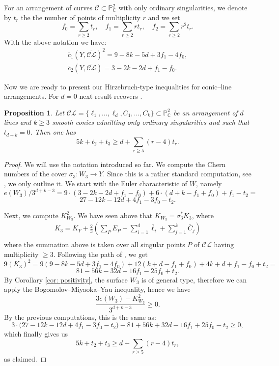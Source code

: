 \documentclass[12pt]{amsart}
\theoremstyle{plain}
\newtheorem{proposition}[thm]{Proposition}
\theoremstyle{definition}
\renewcommand\geq{\geqslant}
\newcommand\oCL{\overline{\mathcal{CL}}}
\begin{document}
For an arrangement of curves $\mathcal C \subset \mathbb{P}^{2}_{\mathbb{C}}$ with only ordinary singularities,  we denote by $t_r$ the the number of points of multiplicity $r$ and we set 
$$ f_{0} = \sum_{r\geq 2}t_{r},\quad f_{1} = \sum_{r\geq 2}rt_{r}, \quad f_{2} = \sum_{r\geq 2}r^2t_{r}.$$
With the above  notation we have:
\begin{gather}\label{eq: chern-numbers}
\bar c_1(Y, \oCL)^2=9 -8k-5d+3f_1-4f_0,\\
\bar c_2(Y, \oCL)=3-2k-2d+f_1-f_0.\nonumber
\end{gather}

Now we are ready to present our Hirzebruch-type inequalities for conic--line arrangements. For $d=0$ next result recovers \cite[Theorem 3.1]{Tang}.

\begin{proposition}\label{HirCL}
Let $\mathcal{CL} = \{\ell_{1}, \dots, \ell_{d}, C_{1}, \dots, C_{k}\} \subset \mathbb{P}^{2}_{\mathbb{C}}$ be an arrangement of $d$ lines and $k\geq 3$ smooth conics admitting only ordinary singularities and such that $t_{d+k}=0$. Then one has
$$5k + t_{2} + t_{3} \geq d + \sum_{r\geq 5}(r-4)t_{r}.$$
\end{proposition}
\begin{proof}
We will use the notation introduced so far. We compute the Chern numbers of  the cover $\sigma_3\colon W_3\to Y$.  Since this is a rather standard computation, see \cite{BHH87, PSz2023}, we only outline it. 
We start with the Euler characteristic of $W$, namely 
$$e(W_{3})/3^{d+k-3}=9\cdot(3-2k-2d+f_{1}-f_{0})+6\cdot (d+k-f_{1}+f_{0}) + f_{1}-t_{2} = $$
$$27-12k-12d+4f_{1}-3f_{0}-t_{2}.$$

Next, we compute $K_{W_3}^{2}$. We have seen above that $K_{W_3}=\sigma_3^*K_3$, where
\begin{gather*}
K_3=K_Y+\frac{2}{3}(\sum_PE_P+\sum_{i=1}^d\bar \ell_i+\sum_{j=1}^k\bar C_j)\\
\end{gather*}
where the summation above is taken over all singular points $P$ of $\mathcal{CL}$ having multiplicity $\geq 3$. 
Following the path of \cite[Kapitel 1.3]{BHH87}, we get
$$9(K_3)^2= 9 (9-8k-5d + 3f_{1}-4f_{0})+ 12 (k+d-f_{1}+f_{0}) + 4k+d+f_{1}-f_{0}+t_{2}=$$
$$81-56k-32d+16f_{1}-25f_{0}+t_{2}.$$
By Corollary \ref{cor: positivity}, the surface $W_3$ is of general type,  therefore we can apply the Bogomolov--Miyaoka--Yau inequality, hence we have
$$\frac{3e(W_3)-K_{W_3}^{2}}{3^{d+k-3}}\geq 0.$$
By the previous computations, this is the same as:
$$3\cdot\bigg(27-12k-12d+4f_{1}-3f_{0}-t_{2}\bigg) -81 + 56k + 32d - 16f_{1} + 25f_{0}- t_{2}\geq 0,$$
which finally gives us
\[
5k+t_{2}+t_{3}\geq d + \sum_{r\geq 5}(r-4)t_{r},
\]
as claimed.
\end{proof}
\end{document}
